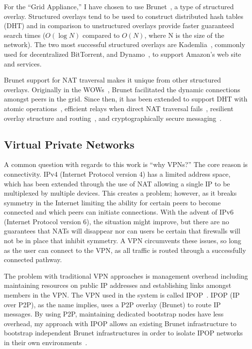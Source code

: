 For the ``Grid Appliance,'' I have chosen to use Brunet~\cite{brunet}, a type of
structured overlay.  Structured overlays tend to be used to construct
distributed hash tables (DHT) and in comparison to unstructured overlays
provide faster guaranteed search times ($O(\log N)$ compared to $O(N)$, where N
is the size of the network).  The two most successful structured overlays are
Kademlia~\cite{kademlia}, commonly used for decentralized BitTorrent, and
Dynamo~\cite{dynamo}, to support Amazon's web site and services.

Brunet support for NAT traversal makes it unique from other structured
overlays.  Originally in the WOWs~\cite{wow}, Brunet facilitated the dynamic
connections amongst peers in the grid.  Since then, it has been extended to
support DHT with atomic operations~\cite{pcgrid07}, efficient relays when
direct NAT traversal fails~\cite{groupvpn}, resilient overlay structure and
routing~\cite{hpdc08_0}, and cryptographically secure
messaging~\cite{groupvpn}.

\subsection{Virtual Private Networks}

A common question with regards to this work is ``why VPNs?''  The core reason
is connectivity.  IPv4 (Internet Protocol version 4) has a limited address
space, which has been extended through the use of NAT allowing a single IP to
be multiplexed by multiple devices.  This creates a problem; however, as it
breaks symmetry in the Internet limiting the ability for certain peers to
become connected and which peers can initiate connections.  With the advent of
IPv6 (Internet Protocol version 6), the situation might improve, but there are
no guarantees that NATs will disappear nor can users be certain that firewalls
will not be in place that inhibit symmetry.  A VPN circumvents these issues, so
long as the user can connect to the VPN, as all traffic is routed through a
successfully connected pathway.

The problem with traditional VPN approaches is management overhead including
maintaining resources on public IP addresses and establishing links amongst
members in the VPN.  The VPN used in the system is called IPOP~\cite{groupvpn,
ipop}.  IPOP (IP over P2P), as the name implies, uses a P2P overlay (Brunet) to
route IP messages.  By using P2P, maintaining dedicated bootstrap nodes have
less overhead, my approach with IPOP allows an existing Brunet infrastructure
to bootstrap independent Brunet infrastructures in order to isolate IPOP
networks in their own environments~\cite{bootstrapping}.

